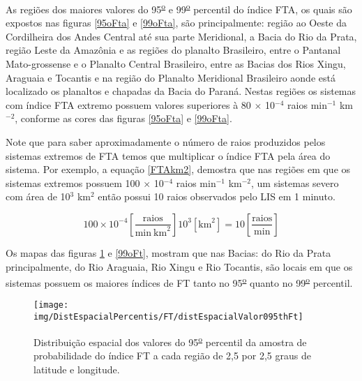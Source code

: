 As regiões dos maiores valores do 95\textsuperscript{\underline{o}} e 99\textsuperscript{\underline{o}} percentil do índice FTA, os quais são expostos nas figuras \ref{95oFta} e \ref{99oFta}, são principalmente:  região ao Oeste da Cordilheira dos Andes Central até sua parte Meridional, a Bacia do Rio da Prata, região Leste da Amazônia e as regiões do planalto Brasileiro, entre o Pantanal Mato-grossense e o Planalto Central Brasileiro, entre as Bacias dos Rios Xingu, Araguaia e Tocantis e na região do Planalto Meridional Brasileiro aonde está localizado os planaltos e chapadas da Bacia do Paraná. Nestas regiões os sistemas com índice FTA extremo possuem valores superiores à 80 $\times$ 10$^{-4}$ raios min$^{-1}$ km$^{-2}$, conforme as cores das figuras \ref{95oFta} e \ref{99oFta}. 


Note que para saber aproximadamente o número de raios produzidos pelos sistemas extremos de FTA temos que multiplicar o índice FTA pela área do sistema. Por exemplo, a equação \ref{FTAkm2}, demostra que nas regiões em que os sistemas extremos possuem 100 $\times$ 10$^{-4}$ raios min$^{-1}$ km$^{-2}$, um sistemas severo com área de 10$^3$ km$^2$ então possui 10 raios observados pelo LIS em 1 minuto.  

\begin{equation}
100 \times 10^{-4} \left[ \frac{\mathrm{raios}}{\mathrm{min}~\mathrm{km}^2} \right]  10^3 [ \mathrm{km}^2 ] = 10 \left[ \frac{\mathrm{raios}}{\mathrm{min}}\right]  
\label{FTAkm2}
\end{equation}

Os mapas das figuras \ref{95oFt} e \ref{99oFt}, mostram que nas Bacias: do Rio da Prata principalmente, do Rio Araguaia, Rio Xingu e Rio Tocantis, são locais em que os sistemas possuem os maiores índices de FT tanto no 95\textsuperscript{\underline{o}} quanto no 99\textsuperscript{\underline{o}} percentil.

\begin{figure}[!ht]
\centering
{\texttt{[image: img/DistEspacialPercentis/FT/distEspacialValor095thFt]}} 
\caption{Distribuição espacial dos valores do 95\textsuperscript{\underline{o}} percentil da amostra de probabilidade do índice FT a cada região de 2,5 por 2,5 graus de latitude e longitude.}
\label{95oFt}
\end{figure} 
  
